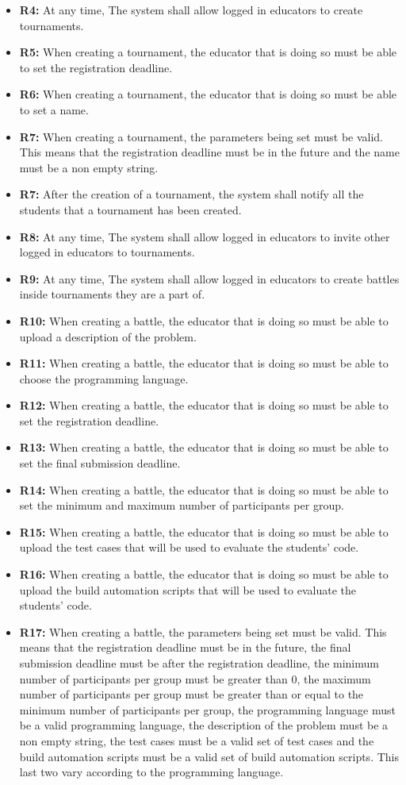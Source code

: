 \documentclass{article}
\begin{document}
\begin{itemize}
    \item \textbf{R4:} At any time, The system shall allow logged in educators to create tournaments.
    \item \textbf{R5:} When creating a tournament, the educator that is doing so must be able to set the registration deadline.
    \item \textbf{R6:} When creating a tournament, the educator that is doing so must be able to set a name.
    \item \textbf{R7:} When creating a tournament, the parameters being set must be valid. This means that the registration deadline must be in the future and the name must be a non empty string.
    \item \textbf{R7:} After the creation of a tournament, the system shall notify all the students that a tournament has been created.
    \item \textbf{R8:} At any time, The system shall allow logged in educators to invite other logged in educators to tournaments.
    \item \textbf{R9:} At any time, The system shall allow logged in educators to create battles inside tournaments they are a part of.
    \item \textbf{R10:} When creating a battle, the educator that is doing so must be able to upload a description of the problem.
    \item \textbf{R11:} When creating a battle, the educator that is doing so must be able to choose the programming language.
    \item \textbf{R12:} When creating a battle, the educator that is doing so must be able to set the registration deadline.
    \item \textbf{R13:} When creating a battle, the educator that is doing so must be able to set the final submission deadline.
    \item \textbf{R14:} When creating a battle, the educator that is doing so must be able to set the minimum and maximum number of participants per group.
    \item \textbf{R15:} When creating a battle, the educator that is doing so must be able to upload the test cases that will be used to evaluate the students' code.
    \item \textbf{R16:} When creating a battle, the educator that is doing so must be able to upload the build automation scripts that will be used to evaluate the students' code.
    \item \textbf{R17:} When creating a battle, the parameters being set must be valid. This means that the registration deadline must be in the future, the final submission deadline must be after the registration deadline, the minimum number of participants per group must be greater than 0, the maximum number of participants per group must be greater than or equal to the minimum number of participants per group, the programming language must be a valid programming language, the description of the problem must be a non empty string, the test cases must be a valid set of test cases and the build automation scripts must be a valid set of build automation scripts. This last two vary according to the programming language.


\end{itemize}
\end{document}
